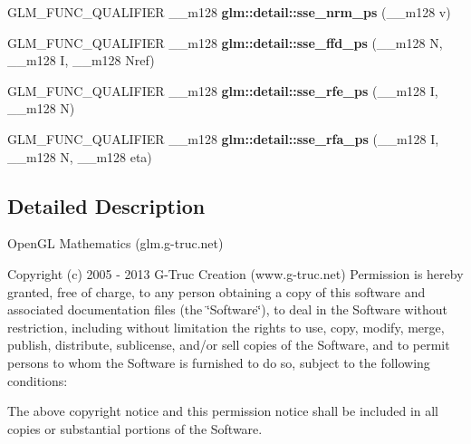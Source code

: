 \begin{DoxyCompactItemize}
\item 
\hypertarget{namespaceglm_1_1detail_a9f1826e935d79fc46faaf70499cba320}{}G\+L\+M\+\_\+\+F\+U\+N\+C\+\_\+\+Q\+U\+A\+L\+I\+F\+I\+E\+R \+\_\+\+\_\+m128 {\bfseries glm\+::detail\+::sse\+\_\+nrm\+\_\+ps} (\+\_\+\+\_\+m128 v)\label{namespaceglm_1_1detail_a9f1826e935d79fc46faaf70499cba320}

\item 
\hypertarget{namespaceglm_1_1detail_ace9256f388e836f9411a6eb92bed1a8a}{}G\+L\+M\+\_\+\+F\+U\+N\+C\+\_\+\+Q\+U\+A\+L\+I\+F\+I\+E\+R \+\_\+\+\_\+m128 {\bfseries glm\+::detail\+::sse\+\_\+ffd\+\_\+ps} (\+\_\+\+\_\+m128 N, \+\_\+\+\_\+m128 I, \+\_\+\+\_\+m128 Nref)\label{namespaceglm_1_1detail_ace9256f388e836f9411a6eb92bed1a8a}

\item 
\hypertarget{namespaceglm_1_1detail_a48dc48d40e141bd2fff6b9c88b7e05e4}{}G\+L\+M\+\_\+\+F\+U\+N\+C\+\_\+\+Q\+U\+A\+L\+I\+F\+I\+E\+R \+\_\+\+\_\+m128 {\bfseries glm\+::detail\+::sse\+\_\+rfe\+\_\+ps} (\+\_\+\+\_\+m128 I, \+\_\+\+\_\+m128 N)\label{namespaceglm_1_1detail_a48dc48d40e141bd2fff6b9c88b7e05e4}

\item 
\hypertarget{namespaceglm_1_1detail_a5086fa9f09dcfec333b9eebeae468767}{}G\+L\+M\+\_\+\+F\+U\+N\+C\+\_\+\+Q\+U\+A\+L\+I\+F\+I\+E\+R \+\_\+\+\_\+m128 {\bfseries glm\+::detail\+::sse\+\_\+rfa\+\_\+ps} (\+\_\+\+\_\+m128 I, \+\_\+\+\_\+m128 N, \+\_\+\+\_\+m128 eta)\label{namespaceglm_1_1detail_a5086fa9f09dcfec333b9eebeae468767}

\end{DoxyCompactItemize}


\subsection{Detailed Description}
Open\+G\+L Mathematics (glm.\+g-\/truc.\+net)

Copyright (c) 2005 -\/ 2013 G-\/\+Truc Creation (www.\+g-\/truc.\+net) Permission is hereby granted, free of charge, to any person obtaining a copy of this software and associated documentation files (the \char`\"{}\+Software\char`\"{}), to deal in the Software without restriction, including without limitation the rights to use, copy, modify, merge, publish, distribute, sublicense, and/or sell copies of the Software, and to permit persons to whom the Software is furnished to do so, subject to the following conditions\+:

The above copyright notice and this permission notice shall be included in all copies or substantial portions of the Software.

